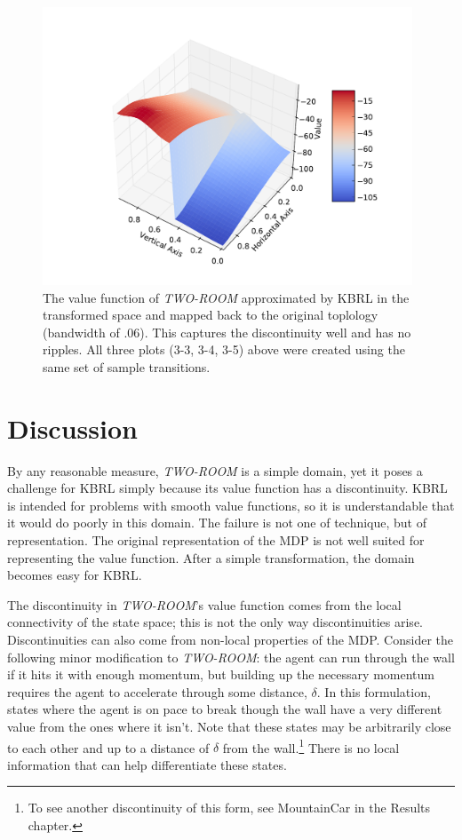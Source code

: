 \begin{figure}[!!!ht]
  \centering
    \includegraphics[width=110mm]{figs/tf2rmvf.pdf}
  \caption[\textit{TWO-ROOM} value function learned in the transformed space]
  {The value function of \textit{TWO-ROOM} approximated by
  KBRL in the transformed space and mapped back to the original toplology
  (bandwidth of $.06$).
  This captures the discontinuity well and has no ripples.
  All three plots (3-3, 3-4, 3-5) above were created using the same
set of sample transitions.}
  \label{fig:tfv2rm}
\end{figure}

\section{Discussion}
By any reasonable measure, \textit{TWO-ROOM} is a simple domain,
yet it poses a challenge for KBRL simply because its value function
has a discontinuity.
KBRL is intended for problems with smooth value functions, so
it is understandable that it would do poorly in this domain.
The failure is not one of technique, but of representation.
The original representation of the MDP is not well suited for
representing the value function.
After a simple transformation, the domain becomes easy for KBRL.

The discontinuity in \textit{TWO-ROOM}'s value function comes from
the local connectivity of the state space;
this is not the only way discontinuities arise.
Discontinuities can also come from non-local properties of the MDP.
Consider the following minor modification to \textit{TWO-ROOM}:
the agent can run through the wall if it hits it with enough momentum,
but building up the necessary momentum requires the agent to accelerate
through some distance, $\delta$.
In this formulation, states where the agent is on pace to break though the wall
have a very different value from the ones where it isn't.
Note that these states may be arbitrarily close to each other and up to
a distance of $\delta$ from the wall.\footnote{To see another discontinuity
of this form, see MountainCar in the Results chapter.}
There is no local information that can help differentiate these states.

